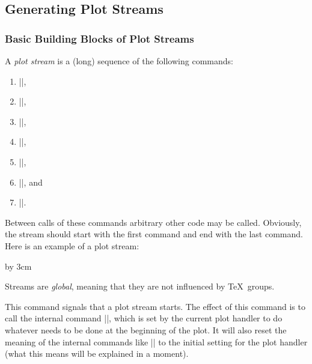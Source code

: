 \subsection{Generating Plot Streams}

\subsubsection{Basic Building Blocks of Plot Streams}

A \emph{plot stream} is a (long) sequence of the following 
commands:
\begin{enumerate}
\item
  |\pgfplotstreamstart|,
\item
  |\pgfplotstreampoint|, 
\item
  |\pgfplotstreampointoutlier|, 
\item
  |\pgfplotstreampointundefined|,
\item
  |\pgfplotstreamnewdataset|,
\item
  |\pgfplotstreamspecial|, and
\item
  |\pgfplotstreamend|.
\end{enumerate}
Between calls of these commands arbitrary other code may be
called. Obviously, the stream should start with the first command and
end with the last command. Here is an example of a plot stream:
\begin{codeexample}
\pgfplotstreamstart
\pgfplotstreampoint{\pgfpoint{1cm}{1cm}}
\newdimen\mydim
\mydim=2cm
\pgfplotstreampoint{\pgfpoint{\mydim}{2cm}}
\advance \mydim by 3cm
\pgfplotstreampoint{\pgfpoint{\mydim}{2cm}}
\pgfplotstreamend
\end{codeexample}

Streams are \emph{global}, meaning that they are not influenced by
\TeX\ groups.

\begin{command}{\pgfplotstreamstart}
  This command signals that a plot stream starts. The effect of this
  command is to call the internal command |\pgf@plotstreamstart|,
  which is set by the current plot handler to do whatever needs to be
  done at the beginning of the plot. It will also reset the
  meaning of the internal commands like |\pgf@plotstreampoint| to the
  initial setting for the plot handler (what this means will be
  explained in a moment).
\end{command}

